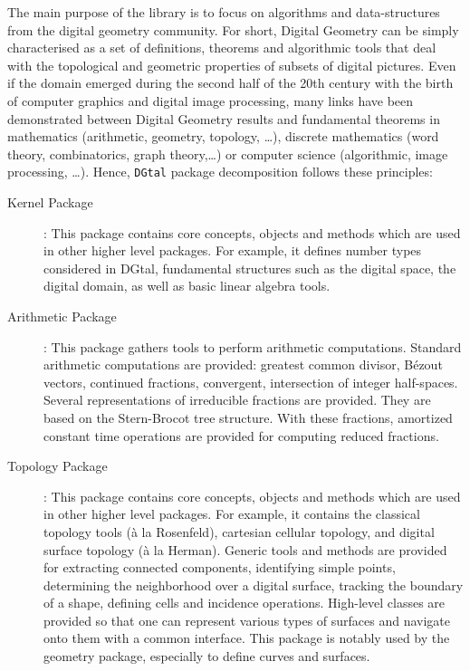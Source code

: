 \documentclass[11pt, a4paper]{article}
\def\DGtal{\texttt{DGtal} }
\begin{document}
The main purpose of the library is to focus on algorithms and
data-structures from the digital geometry community. For short,
Digital Geometry can be simply characterised as a set of definitions,
theorems and algorithmic tools that deal with the topological and
geometric properties of subsets of digital pictures. Even if the
domain emerged during the second half of the 20th century with the
birth of computer graphics and digital image processing, many links
have been demonstrated between Digital Geometry results and
fundamental theorems in mathematics (arithmetic, geometry, topology,
\ldots), discrete mathematics (word theory, combinatorics, graph
theory,\ldots) or computer science (algorithmic, image processing,
\ldots).
Hence, \DGtal package decomposition follows these principles:
\begin{description}
  \item[Kernel Package]: This package contains core concepts, objects
    and methods which are used in other higher level packages. For
    example, it defines number types considered in DGtal, fundamental
    structures such as the digital space, the digital domain, as well
    as basic linear algebra tools.

  \item[Arithmetic Package]: This package gathers tools to perform
    arithmetic computations. Standard arithmetic computations are
    provided: greatest common divisor, Bézout vectors, continued
    fractions, convergent, intersection of integer
    half-spaces. Several representations of irreducible fractions are
    provided. They are based on the Stern-Brocot tree structure. With
    these fractions, amortized constant time operations are provided
    for computing reduced fractions. 



  \item[Topology Package]: This package contains core concepts,
    objects and methods which are used in other higher level packages.
    For example, it contains the classical topology tools (à la
    Rosenfeld), cartesian cellular topology, and digital surface
    topology (à la Herman). Generic tools and methods are provided for
    extracting connected components, identifying simple points,
    determining the neighborhood over a digital surface, tracking the
    boundary of a shape, defining cells and incidence
    operations. High-level classes are provided so that one can
    represent various types of surfaces and navigate onto them with a
    common interface.  This package is notably used by the geometry
    package, especially to define curves and surfaces.


\end{description}
\end{document}
